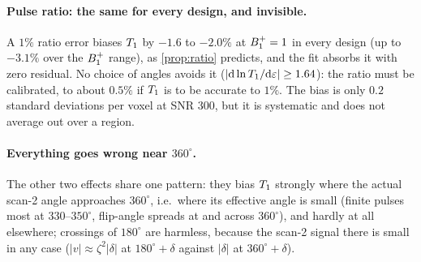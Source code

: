 \paragraph{Pulse ratio: the same for every design, and invisible.} A $1\%$ ratio error biases $T_1$ by
$-1.6$ to $-2.0\%$ at $B_1^{+}=1$ in every design (up to $-3.1\%$ over the $B_1^{+}$ range), as \cref{prop:ratio}
predicts, and the fit absorbs it with zero residual. No choice of angles avoids it
($|\mathrm d\ln T_1/\mathrm d\varepsilon|\ge1.64$): the ratio must be calibrated, to about $0.5\%$ if $T_1$ is to be accurate to
$1\%$. The bias is only $0.2$ standard deviations per voxel at SNR 300, but it is systematic and does
not average out over a region.

\paragraph{Everything goes wrong near $360^\circ$.} The other two effects share one pattern: they bias
$T_1$ strongly where the actual scan-2 angle approaches $360^\circ$, i.e.\ where its effective angle is small
(finite pulses most at $330$--$350^\circ$, flip-angle spreads at and across $360^\circ$), and hardly at all elsewhere; crossings of $180^\circ$ are harmless, because the scan-2 signal there is
small in any case ($|v|\approx\zeta^2|\delta|$ at $180^\circ+\delta$ against $|\delta|$ at $360^\circ+\delta$).
